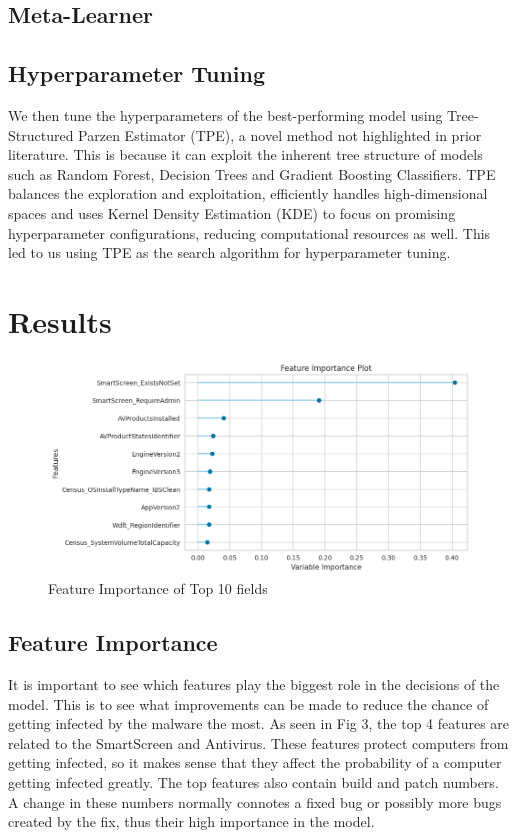 \documentclass[runningheads]{llncs}
\begin{document}
\subsection{Meta-Learner}

\subsection{Hyperparameter Tuning}
We then tune the hyperparameters of the best-performing model using Tree-Structured Parzen Estimator (TPE), a novel method not highlighted in prior literature. This is because it can exploit the inherent tree structure of models such as Random Forest, Decision Trees and Gradient Boosting Classifiers. TPE balances the exploration and exploitation, efficiently handles high-dimensional spaces and uses Kernel Density Estimation (KDE) to focus on promising hyperparameter configurations, reducing computational resources as well. This led to us using TPE as the search algorithm for hyperparameter tuning.

\section{Results}

\begin{figure}[!h]
\includegraphics[scale=0.5]{images/importance.png}
\centering
\caption{Feature Importance of Top 10 fields}
\label{Fig 3}
\end{figure}

\subsection{Feature Importance} It is important to see which features play the biggest role in the decisions of the model. This is to see what improvements can be made to reduce the chance of getting infected by the malware the most. As seen in Fig 3, the top 4 features are related to the SmartScreen and Antivirus. These features protect computers from getting infected, so it makes sense that they affect the probability of a computer getting infected greatly. The top features also contain build and patch numbers. A change in these numbers normally connotes a fixed bug or possibly more bugs created by the fix, thus their high importance in the model. 
\end{document}
